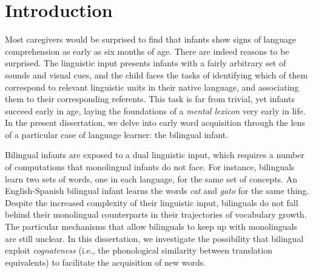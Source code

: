 \documentclass[
  12pt,
  b5paperpaper,
  twoside]{scrreprt}
\renewcommand*\contentsname{Table of contents}
\newcommand\contentsname{Table of contents}
\begin{document}
\renewcommand*\contentsname{Table of contents}
{
\hypersetup{linkcolor=}
\setcounter{tocdepth}{2}
\tableofcontents
}

\hypertarget{section}{%
\chapter*{}\label{section}}

\markboth{}{}



\hypertarget{introduction}{%
\chapter{Introduction}\label{introduction}}

Most caregivers would be surprised to find that infants show signs of
language comprehension as early as six months of age. There are indeed
reasons to be surprised. The linguistic input presents infants with a
fairly arbitrary set of sounds and visual cues, and the child faces the
tasks of identifying which of them correspond to relevant linguistic
units in their native language, and associating them to their
corresponding referents. This task is far from trivial, yet infants
succeed early in age, laying the foundations of a \emph{mental lexicon}
very early in life. In the present dissertation, we delve into early
word acquisition through the lens of a particular case of language
learner: the bilingual infant.

Bilingual infants are exposed to a dual linguistic input, which requires
a number of computations that monolingual infants do not face. For
instance, bilinguals learn two sets of words, one in each language, for
the same set of concepts. An English-Spanish bilingual infant learns the
words \emph{cat} and \emph{gato} for the same thing. Despite the
increased complexity of their linguistic input, bilinguals do not fall
behind their monolingual counterparts in their trajectories of
vocabulary growth. The particular mechanisms that allow bilinguals to
keep up with monolinguals are still unclear. In this dissertation, we
investigate the possibility that bilingual exploit \emph{cognateness}
(i.e., the phonological similarity between translation equivalents) to
facilitate the acquisition of new words.
\end{document}
